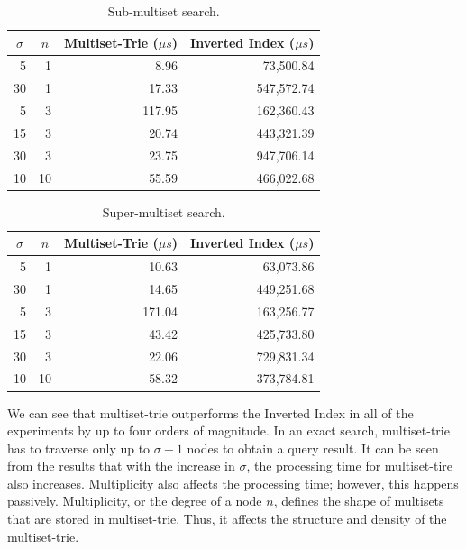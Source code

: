 \documentclass[algorithms,article,accept,pdftex,moreauthors]{Definitions/mdpi}
\begin{document}
\begin{table}[H]
\caption{Sub-multiset search.}
\label{t:res_sub}
\begin{tabularx}{\textwidth}{rrrr}
\toprule
\multicolumn{1}{c}{\boldmath$\sigma$} & 
\multicolumn{1}{c}{\boldmath$n$} & 
\multicolumn{1}{c}{\textbf{Multiset-Trie (\boldmath$\mu s$)}} & 
\multicolumn{1}{c}{\textbf{Inverted Index (\boldmath$\mu s$)}} \\
\midrule
5		& 1			& 8.96 & 73,500.84\\
30	& 1			& 17.33 & 547,572.74\\
5		& 3			& 117.95 & 162,360.43\\
15	& 3			& 20.74 & 443,321.39\\
30	& 3 		& 23.75 & 947,706.14\\
10	& 10		& 55.59 & 466,022.68\\
\bottomrule
\end{tabularx}
\end{table}

\begin{table}[H]
\caption{Super-multiset search.}
\label{t:res_sup}
\begin{tabularx}{\textwidth}{rrrr}
\toprule
\multicolumn{1}{c}{\boldmath$\sigma$} & 
\multicolumn{1}{c}{\boldmath$n$} & 
\multicolumn{1}{c}{\textbf{Multiset-Trie (\boldmath$\mu s$)}} & 
\multicolumn{1}{c}{\textbf{Inverted Index (\boldmath$\mu s$)}} \\
\midrule
5		& 1 		& 10.63 & 63,073.86\\
30	& 1 		& 14.65 & 449,251.68\\
5		& 3 		& 171.04 & 163,256.77\\
15	& 3 		& 43.42 & 425,733.80\\
30	& 3 		& 22.06 & 729,831.34\\
10	& 10 	& 58.32 & 373,784.81\\
\bottomrule
\end{tabularx}
\end{table}

We can see that multiset-trie outperforms the Inverted Index in all of the
experiments by up to four orders of magnitude. In an exact search,
multiset-trie has to traverse only up to $\sigma+1$ nodes to obtain a query
result. It can be seen from the results that with the increase in $\sigma$,
the processing time for multiset-tire also increases. Multiplicity
also affects the processing time; however, this happens
passively. Multiplicity, or the degree of a node $n$, defines the shape of
multisets that are stored in multiset-trie. Thus, it affects the
structure and density of the multiset-trie.
\end{document}
